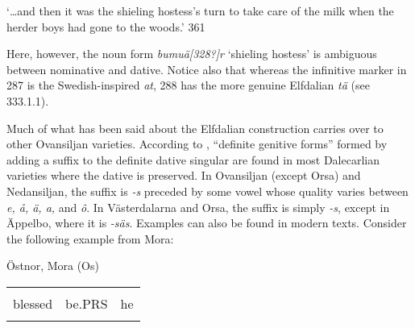 \begin{styleTranslation}
‘…and then it was the shieling hostess’s turn to take care of the milk when the herder boys had gone to the woods.’ 361

\end{styleTranslation}

\begin{styleBodytextC}
Here, however, the noun form \textit{bumuä[328?]r} ‘shieling hostess’ is ambiguous between nominative and dative. Notice also that whereas the infinitive marker in 287 is the Swedish-inspired \textit{at}, 288 has the more genuine Elfdalian \textit{tä} (see 333.1.1). 

\end{styleBodytextC}

\begin{styleBodytextC}
Much of what has been said about the Elfdalian construction carries over to other Ovansiljan varieties. According to \citet[170]{Levander1928}, “definite genitive forms” formed by adding a suffix to the definite dative singular are found in most Dalecarlian varieties where the dative is preserved. In Ovansiljan (except Orsa) and Nedansiljan, the suffix is\textit{ -s} preceded by some vowel whose quality varies between \textit{e, å, ä, a,} and \textit{ô}. In Västerdalarna and Orsa, the suffix is simply\textit{ -s}, except in Äppelbo, where it is\textit{ -säs}. Examples can also be found in modern texts. Consider the following example from Mora:

\end{styleBodytextC}

\begin{listWWNumileveli}
\item {}

\begin{styleExample}
Östnor, Mora (Os)

\end{styleExample}

\end{listWWNumileveli}

\begin{tabular}{lll}
\lsptoprule
\multicolumn{3}{l}{Welsignarn

}\\
blessed & be.PRS & he\\
\lspbottomrule
\end{tabular}


